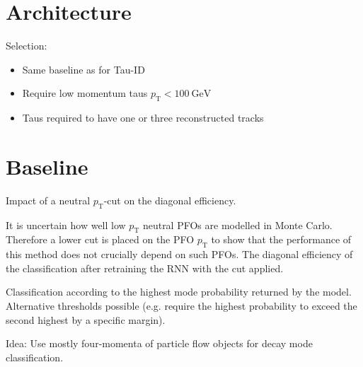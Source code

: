 \section{Architecture}
\label{sec:pfo_architecture}


Selection:
\begin{itemize}
\item Same baseline as for Tau-ID
\item Require low momentum taus $p_\text{T} < \SI{100}{\giga\electronvolt}$
\item Taus required to have one or three reconstructed tracks
\end{itemize}

\section{Baseline}
\label{sec:pfo_baseline}

\begin{table}[ht]
  \centering
  
  \caption{Impact of a neutral $p_\text{T}$-cut on the diagonal
    efficiency.}
  \label{tab:neut_ptcut}
\end{table}

It is uncertain how well low $p_\text{T}$ neutral PFOs are modelled in Monte
Carlo. Therefore a lower cut is placed on the PFO $p_\text{T}$ to show that the
performance of this method does not crucially depend on such PFOs. The diagonal
efficiency of the classification after retraining the RNN with the cut applied.

Classification according to the highest mode probability returned by the model.
Alternative thresholds possible (e.g. require the highest probability to exceed
the second highest by a specific margin).



Idea: Use mostly four-momenta of particle flow objects for decay mode
classification.

